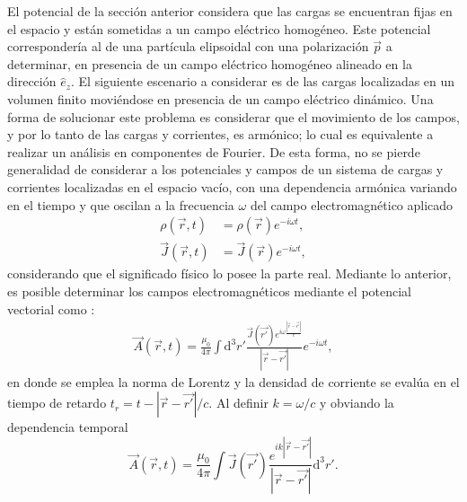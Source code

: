 El potencial de la sección anterior considera que las cargas se encuentran fijas en el espacio y están sometidas a un campo eléctrico homogéneo. Este potencial correspondería al de una partícula elipsoidal con una polarización $\Vec{p}$ a determinar, en presencia de un campo eléctrico homogéneo alineado en la dirección $\hat{e}_z$. El siguiente escenario a considerar es de las cargas localizadas en un volumen finito moviéndose en presencia de un campo eléctrico dinámico. Una forma de solucionar este problema es considerar que el movimiento de los campos, y por lo tanto de las cargas y corrientes, es armónico; lo cual es equivalente a realizar un análisis en componentes de Fourier. De esta forma, no se pierde generalidad de considerar a los potenciales y campos de un sistema de cargas y corrientes localizadas en el espacio vacío, con una dependencia armónica variando en el tiempo y que oscilan a la frecuencia $\omega$ del campo electromagnético aplicado \cite{Jackson}
\begin{align}
    \rho(\Vec{r},t)&=\rho(\Vec{r})e^{-i\omega t},\nonumber\\
    \Vec{J}(\Vec{r},t)&=\Vec{J}(\Vec{r})e^{-i\omega t},
    \label{armonicf}
\end{align}
considerando que el significado físico lo posee la parte real. Mediante lo anterior, es posible determinar los campos electromagnéticos mediante el potencial vectorial como \cite{Jackson}:
\begin{align*}
  \Vec{A}(\Vec{r},t)=\frac{\mu_0}{4\pi}\int \text{d}^3r'\frac{\Vec{J}(\Vec{r'})e^{i\omega \frac{|\Vec{r}-\Vec{r'}|}{c}}}{|\Vec{r}-\Vec{r'}|}e^{-i\omega t},
\end{align*}
en donde se emplea la norma de Lorentz \cite{Griffiths} y la densidad de corriente se evalúa en el tiempo de retardo $t_r=t-|\Vec{r}-\Vec{r'}|/c$. Al definir $k=\omega/c$ y obviando la dependencia temporal
\begin{equation}
    \Vec{A}(\Vec{r},t)=\frac{\mu_0}{4\pi}\int \Vec{J}(\Vec{r'})\frac{e^{ik|\Vec{r}-\Vec{r'}|}}{|\Vec{r}-\Vec{r'}|} \text{d}^3r'.
    \label{pot_vectorial}
\end{equation} 

